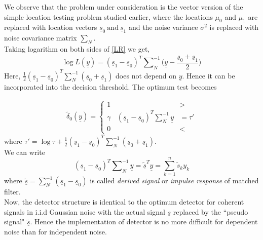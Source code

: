 \documentclass[a4paper,english,12pt]{article}
\begin{document}
We observe that the problem under consideration is the vector version of the simple location testing problem studied earlier, where the locations $\mu _0$ and $\mu _1$ are replaced with location vectors $\underline{s}_0 \ \mbox{and} \ \underline{s}_1$ and the noise variance $\sigma ^2$ is replaced with noise covariance matrix $\sum_N$.\\
Taking logarithm on both sides of \eqref{LR} we get,
$$
\log L(\underline{y}) = (\underline{s}_1-\underline{s}_0)^T\sum\nolimits_N^{-1} \Big(\underline{y} - \dfrac{\underline{s}_0 + \underline{s}_1}{2} \Big)
$$  
Here, $\frac{1}{2}(\underline{s}_1-\underline{s}_0)^T \sum_N^{-1}(\underline{s}_0+\underline{s}_1)$ does not depend on $\underline{y}$. Hence it can be incorporated into the decision threshold. The optimum test becomes

\begin{align}
\tilde{\delta}_0 (\underline{y}) =  
\begin{cases}
1 &>  \\
\gamma  \ \ \ \  (\underline{s}_1-\underline{s}_0)^T \sum\nolimits_N^{-1} \underline{y} &= \tau' \\
0 &<
\end{cases}
\label{dr}
\end{align}
where $\tau'=\log\tau + \frac{1}{2}(\underline{s}_1-\underline{s}_0)^T \sum_N^{-1} (\underline{s}_0+\underline{s}_1)$.\\ We can write
\begin{equation}
(\underline{s}_1-\underline{s}_0)^T \sum\nolimits_N^{-1} \underline{y}=\tilde{\underline{s}}^T\underline{y}=\sum_{k=1}^n \tilde{s}_ky_k
\end{equation}
where $\tilde{\underline{s}}=\sum_N^{-1}(\underline{s}_1-\underline{s}_0)$ is called \textit{derived signal} or \textit{impulse response} of matched filter.\\
Now, the detector structure is identical to the optimum detector for coherent signals in i.i.d Gaussian noise with the actual signal $\underline{s}$  replaced by the ``pseudo signal" $\tilde{\underline{s}}$. Hence the implementation of detector is no more difficult for dependent noise than for independent noise.
\end{document}
